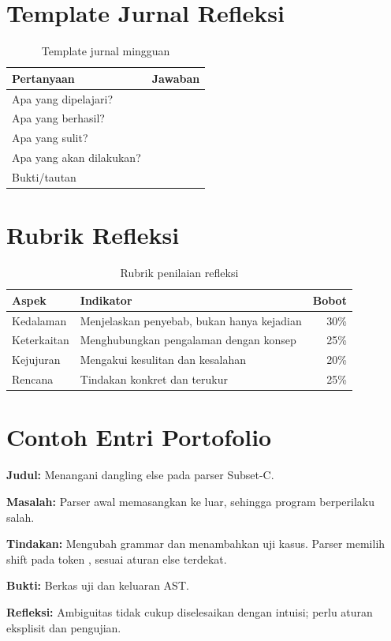 \section{Template Jurnal Refleksi}
\label{app:tugas-jurnal}

\begin{table}[H]
\centering
\caption{Template jurnal mingguan}
\label{tab:app-jurnal}
\begin{tabularx}{\textwidth}{@{}lX@{}}
\toprule
\textbf{Pertanyaan} & \textbf{Jawaban} \\
\midrule
Apa yang dipelajari? & \\
Apa yang berhasil? & \\
Apa yang sulit? & \\
Apa yang akan dilakukan? & \\
Bukti/tautan & \\
\bottomrule
\end{tabularx}
\end{table}

\section{Rubrik Refleksi}
\label{app:tugas-refleksi}

\begin{table}[H]
\centering
\caption{Rubrik penilaian refleksi}
\label{tab:app-rubrik-refleksi}
\begin{tabularx}{\textwidth}{@{}lXr@{}}
\toprule
\textbf{Aspek} & \textbf{Indikator} & \textbf{Bobot} \\
\midrule
Kedalaman & Menjelaskan penyebab, bukan hanya kejadian & 30\% \\
Keterkaitan & Menghubungkan pengalaman dengan konsep & 25\% \\
Kejujuran & Mengakui kesulitan dan kesalahan & 20\% \\
Rencana & Tindakan konkret dan terukur & 25\% \\
\bottomrule
\end{tabularx}
\end{table}

\section{Contoh Entri Portofolio}
\label{app:tugas-portofolio}

\begin{casestudy}
\textbf{Judul:} Menangani dangling else pada parser Subset-C.

\textbf{Masalah:} Parser awal memasangkan  ke 
luar, sehingga program  berperilaku
salah.

\textbf{Tindakan:} Mengubah grammar dan menambahkan uji kasus.
Parser memilih shift pada token , sesuai aturan else
terdekat.

\textbf{Bukti:} Berkas uji  dan keluaran AST.

\textbf{Refleksi:} Ambiguitas tidak cukup diselesaikan dengan
intuisi; perlu aturan eksplisit dan pengujian.
\end{casestudy}
